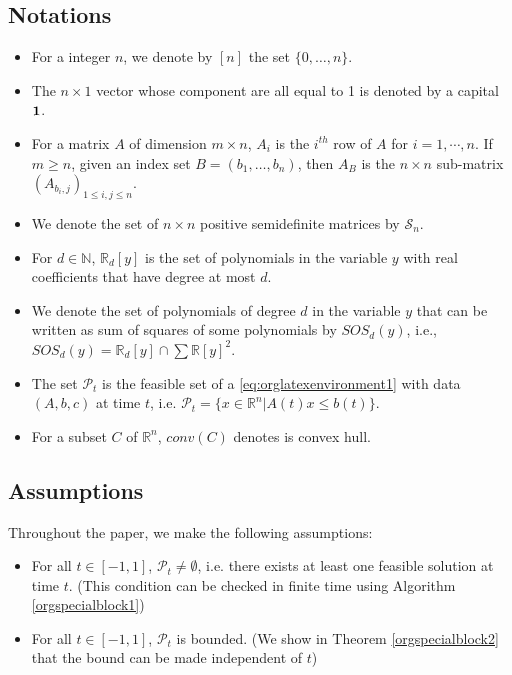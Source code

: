 \documentclass[moor]{informs1}
\begin{document}
\subsection{Notations}
\label{sec:orgheadline1}
\begin{itemize}
\item For a  integer \(n\), we denote by \([n]\) the set \(\{0, \ldots, n\}\).
\item The \(n \times 1\) vector whose component are all equal to 1 is denoted by a capital \(\bf{1}\).
\item For a matrix \(A\) of dimension \(m \times n\), \(A_i\) is the \(i^{th}\) row of \(A\) for \(i=1, \cdots, n\). If \(m \ge n\), given an index set \(B = (b_1, \ldots, b_n)\), then \(A_B\) is the \(n \times n\) sub-matrix \((A_{b_i,j})_{1 \le i, j \le n}\).
\item We denote the set of \(n \times n\) positive semidefinite matrices by \(\mathcal S_n\).
\item For \(d \in \mathbb N\), \(\mathbb R_d[y]\) is the set of polynomials in the variable \(y\) with real coefficients that have degree  at most \(d\).
\item We denote the set of polynomials of degree \(d\) in the variable \(y\) that can be written as sum of squares of some polynomials by \(SOS_d(y)\), i.e., \(SOS_d(y) = \mathbb R_d[y] \cap \sum \mathbb R[y]^2\).
\item The set \(\mathcal P_t\) is the feasible set of a \ref{eq:orglatexenvironment1} with data \((A, b, c)\) at time \(t\), i.e. \(\mathcal P_t = \{x \in \mathbb R^n | A(t) x \le b(t) \}\).
\item For a subset \(C\) of \(\mathbb R^n\), \(conv(C)\) denotes is convex hull.
\end{itemize}
\newpage

\subsection{Assumptions}
\label{sec:orgheadline2}
Throughout the paper, we make the following assumptions:
\begin{itemize}
\item For all \(t \in [-1, 1]\), \(\mathcal P_t \ne \emptyset\), i.e. there exists at least one feasible solution at time \(t\). (This condition can be checked in finite time using Algorithm \ref{orgspecialblock1})
\item For all \(t \in [-1, 1]\),  \(\mathcal P_t\) is bounded. (We show in Theorem \ref{orgspecialblock2} that the bound can be made independent of \(t\))
\end{itemize}
\newpage
\end{document}
